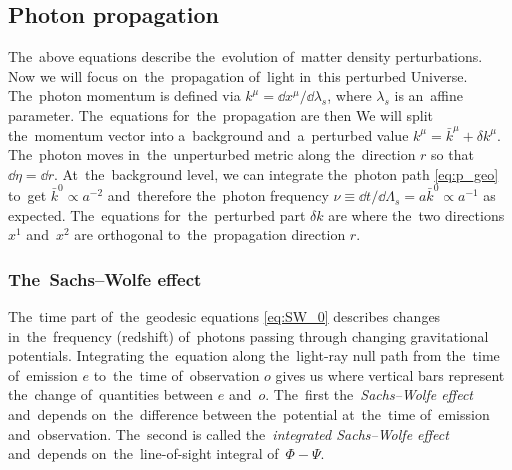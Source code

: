 \subsection{Photon propagation}
The~above equations describe the~evolution of~matter density perturbations. Now we will focus on~the~propagation of~light in~this perturbed Universe. The~photon momentum is defined via $k^\mu=\dd x^\mu/\dd\lambda_s$, where $\lambda_s$ is an~affine parameter. The~equations for~the~propagation are then
We will split the~momentum vector into a~background and~a~perturbed value $k^\mu=\bar k^\mu+\delta k^\mu$. The~photon moves in~the~unperturbed metric along the~direction $r$ so that $\dd\eta=\dd r$. At~the~background level, we can integrate the~photon path \eqref{eq:p_geo} to~get $\bar k^0\propto a^{-2}$ and~therefore the~photon frequency $\nu\equiv\dd t/\dd\Lambda_s=a\bar k^0\propto a^{-1}$ as expected. The~equations for~the~perturbed part $\delta k$ are \parencite[for~details see e.g. ][]{2010deto.book.....A}
where the~two directions $x^1$ and~$x^2$ are orthogonal to~the~propagation direction $r$.
\subsubsection{The~Sachs--Wolfe effect}
The~time part of~the~geodesic equations \eqref{eq:SW_0} describes changes in~the~frequency (redshift) of~photons passing through changing gravitational potentials. Integrating the~equation along the~light-ray null path from the~time of~emission $e$ to~the~time of~observation $o$ gives us
where vertical bars represent the~change of~quantities between $e$ and~$o$. The~first \DIFdelbegin {}\DIFdelend \DIFaddbegin {}\DIFaddend the~\textit{Sachs--Wolfe effect} and~depends on~the~difference between the~potential at~the~time of~emission and~observation. The~second \DIFdelbegin {}\DIFdelend \DIFaddbegin {}\DIFaddend is called the~\textit{integrated Sachs--Wolfe effect} and~depends on~the~line-of-sight integral of~$\Phi-\Psi$.
